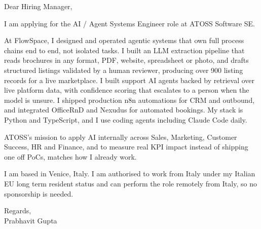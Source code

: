 \documentclass[a4paper,11pt]{article}
\begin{document}
Dear Hiring Manager,

I am applying for the AI / Agent Systems Engineer role at ATOSS Software SE.

At FlowSpace, I designed and operated agentic systems that own full process chains end to end, not isolated tasks. I built an LLM extraction pipeline that reads brochures in any format, PDF, website, spreadsheet or photo, and drafts structured listings validated by a human reviewer, producing over 900 listing records for a live marketplace. I built support AI agents backed by retrieval over live platform data, with confidence scoring that escalates to a person when the model is unsure. I shipped production n8n automations for CRM and outbound, and integrated OfficeRnD and Nexudus for automated bookings. My stack is Python and TypeScript, and I use coding agents including Claude Code daily.

ATOSS's mission to apply AI internally across Sales, Marketing, Customer Success, HR and Finance, and to measure real KPI impact instead of shipping one off PoCs, matches how I already work.

I am based in Venice, Italy. I am authorised to work from Italy under my Italian EU long term resident status and can perform the role remotely from Italy, so no sponsorship is needed.

Regards,\\
Prabhavit Gupta
\end{document}
